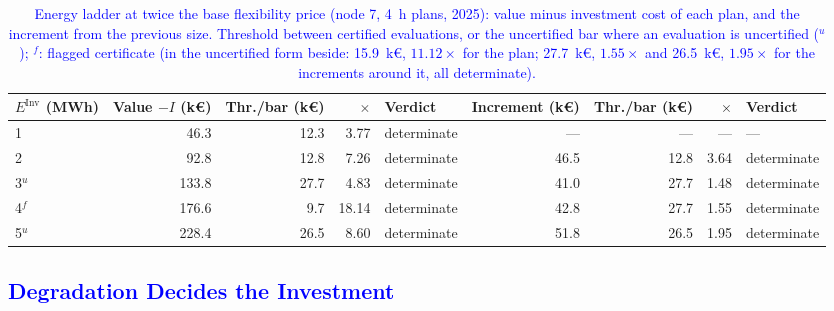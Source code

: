 \begin{table}[htbp!]
    \centering
    \caption{\textcolor{blue}{Energy ladder at twice the base flexibility price (node 7, 4~h plans, 2025): value minus investment cost of each plan, and the increment from the previous size. Threshold between certified evaluations, or the uncertified bar where an evaluation is uncertified ($^{u}$); $^{f}$: flagged certificate (in the uncertified form beside: 15.9~k\euro, $11.12\times$ for the plan; 27.7~k\euro, $1.55\times$ and 26.5~k\euro, $1.95\times$ for the increments around it, all determinate).}}
    \label{tab:res_energy_ladder_m2}
    \scriptsize\setlength{\tabcolsep}{3pt}
    \begin{tabular}{l r r r l r r r l}
        \toprule
        $E^{\text{Inv}}$ (MWh) & Value $- I$ (k\euro) & Thr./bar (k\euro) & $\times$ & Verdict & Increment (k\euro) & Thr./bar (k\euro) & $\times$ & Verdict \\
        \midrule
        1         & 46.3  & 12.3 & 3.77  & determinate & ---  & ---  & ---  & --- \\
        2         & 92.8  & 12.8 & 7.26  & determinate & 46.5 & 12.8 & 3.64 & determinate \\
        3$^{u}$   & 133.8 & 27.7 & 4.83  & determinate & 41.0 & 27.7 & 1.48 & determinate \\
        4$^{f}$   & 176.6 & 9.7  & 18.14 & determinate & 42.8 & 27.7 & 1.55 & determinate \\
        5$^{u}$   & 228.4 & 26.5 & 8.60  & determinate & 51.8 & 26.5 & 1.95 & determinate \\
        \bottomrule
    \end{tabular}
\end{table}

\subsection{\textcolor{blue}{Degradation Decides the Investment}}
\label{subsec:res_degradation}

